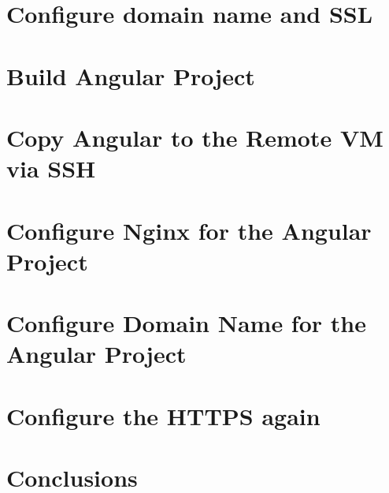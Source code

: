 \documentclass[12pt,letterpaper,oneside,reqno]{amsart}
\numberwithin{equation}{section}
\begin{document}
    \section{Configure domain name and SSL}\label{sec:configure-domain-name-and-ssl}
    


    \section{Build Angular Project}\label{sec:build-angular-project}
    


    \section{Copy Angular to the Remote VM via SSH}\label{sec:copy-angular-to-the-remote-vm-via-ssh}
    


    \section{Configure Nginx for the Angular Project}\label{sec:configure-nginx-for-the-angular-project}
    


    \section{Configure Domain Name for the Angular Project}\label{sec:configure-domain-name-for-the-angular-project}
    


    \section{Configure the HTTPS again}\label{sec:configure-the-https-again}
    


    \section{Conclusions}\label{sec:conclusions}
    

    
    
\end{document}
